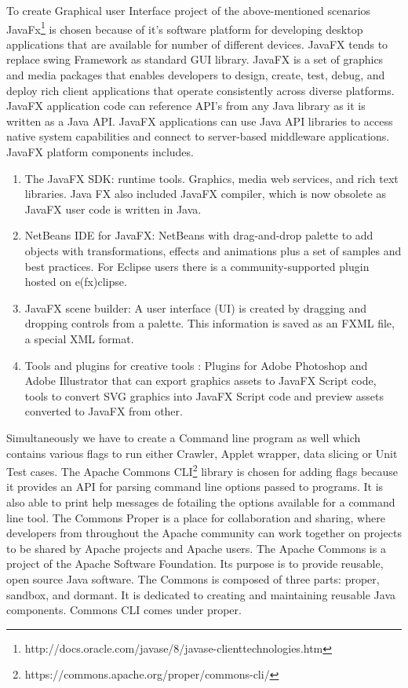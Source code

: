 \documentclass[article,type=msc,colorback,accentcolor=tud9c,twoside,11pt]{tudthesis}
\begin{document}
To create Graphical user Interface project of the above-mentioned scenarios JavaFx\footnote{http://docs.oracle.com/javase/8/javase-clienttechnologies.htm} is chosen because of it's software platform for developing desktop applications that are available for number of different devices. JavaFX tends to replace swing Framework as standard GUI library. JavaFX is a set of graphics and media packages that enables developers to design, create, test, debug, and deploy rich client applications that operate consistently across diverse platforms. JavaFX application code can reference API's from any Java library as it is written as a Java API. JavaFX applications can use Java API libraries to access native system capabilities and connect to server-based middleware applications. JavaFX platform components includes.
\begin{enumerate}
\item The JavaFX SDK: runtime tools. Graphics, media web services, and rich text libraries. Java FX  also included JavaFX compiler, which is now obsolete as JavaFX user code is written in Java.
\item NetBeans IDE for JavaFX: NetBeans with drag-and-drop palette to add objects with transformations, effects and animations plus a set of samples and best practices. For Eclipse users there is a community-supported plugin hosted on e(fx)clipse.
\item JavaFX scene builder: A user interface (UI) is created by dragging and dropping controls from a palette. This information is saved as an FXML file, a special XML format.
\item Tools and plugins for creative tools : Plugins for Adobe Photoshop and Adobe Illustrator that can export graphics assets to JavaFX Script code, tools to convert SVG graphics into JavaFX Script code and preview assets converted to JavaFX from other.
\end{enumerate}

Simultaneously we have to create a Command line program as well which contains various flags to run either Crawler, Applet wrapper, data slicing or Unit Test cases.  The Apache Commons CLI\footnote{https://commons.apache.org/proper/commons-cli/} library is chosen for adding flags because it provides an API for parsing command line options passed to programs. It is also able to print help messages de fotailing the options available for a command line tool. The Commons Proper is a place for collaboration and sharing, where developers from throughout the Apache community can work together on projects to be shared by Apache projects and Apache users. The Apache Commons is a project of the Apache Software Foundation. Its purpose is to provide reusable, open source Java software. The Commons is composed of three parts: proper, sandbox, and dormant. It is dedicated to creating and maintaining reusable Java components. Commons CLI comes under proper.
\end{document}
